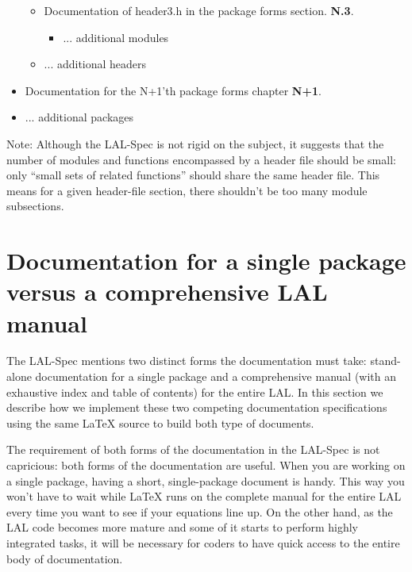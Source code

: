 \documentclass[oneside]{book}
\begin{document}
\begin{itemize}
\begin{itemize}
        \item Documentation of header3.h in the package forms section.
             {\large \bf N.3}.
             \begin{itemize}
                 \vspace*{-0.051in}
                 \item ... additional modules
             \end{itemize}
        \vspace*{-0.051in}
        \item ... additional headers
    \end{itemize}
    \vspace*{-0.1in}
    \item Documentation for the N+1'th package forms chapter {\large \bf N+1}.
    \item ... additional packages
\end{itemize}

Note: Although the LAL-Spec is not rigid on the subject, it suggests
that the number of modules and functions encompassed by a header file
should be small:  only ``small sets of related functions'' should
share the same header file. This means for a given header-file
section, there shouldn't be too many module subsections.


\section{Documentation for a single package versus a comprehensive LAL manual}

The LAL-Spec mentions two distinct forms the documentation must take:
stand-alone documentation for a single package and  a comprehensive
manual (with an exhaustive index and table of contents) for the entire
LAL.  In this section we describe how we implement these two competing
documentation specifications using the same {\LaTeX} source to build
both type of documents.

The requirement of both forms of the documentation in the LAL-Spec is
not capricious: both forms of the documentation are useful. When you
are working on a single package, having a short, single-package
document is handy.  This way you won't have to wait while {\LaTeX} runs
on the complete manual for the entire LAL every time you want to see
if your equations line up. On the other hand, as the LAL code becomes
more mature and some of it starts to perform highly integrated tasks,
it will be necessary for coders to have quick access to the entire
body of documentation.
\end{document}
